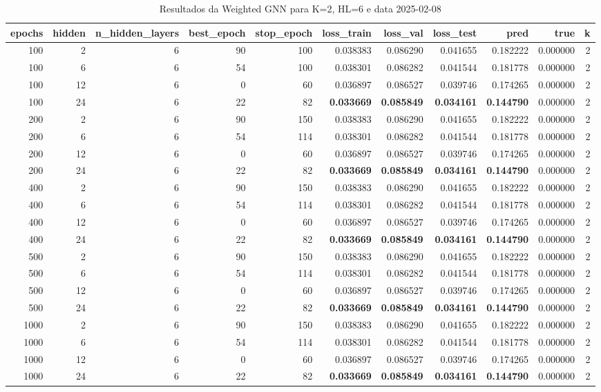 \begin{table}
\caption{Resultados da Weighted GNN para K=2, HL=6 e data 2025-02-08}
\label{tab:weighted_gnn_results_k2_hl6_d20250208}
\begin{tabular}{rrrrrrrrrrr}
\toprule
epochs & hidden & n\_hidden\_layers & best\_epoch & stop\_epoch & loss\_train & loss\_val & loss\_test & pred & true & k \\
\midrule
100 & 2 & 6 & 90 & 100 & 0.038383 & 0.086290 & 0.041655 & 0.182222 & 0.000000 & 2 \\
100 & 6 & 6 & 54 & 100 & 0.038301 & 0.086282 & 0.041544 & 0.181778 & 0.000000 & 2 \\
100 & 12 & 6 & 0 & 60 & 0.036897 & 0.086527 & 0.039746 & 0.174265 & 0.000000 & 2 \\
100 & 24 & 6 & 22 & 82 & \textbf{0.033669} & \textbf{0.085849} & \textbf{0.034161} & \textbf{0.144790} & 0.000000 & 2 \\
200 & 2 & 6 & 90 & 150 & 0.038383 & 0.086290 & 0.041655 & 0.182222 & 0.000000 & 2 \\
200 & 6 & 6 & 54 & 114 & 0.038301 & 0.086282 & 0.041544 & 0.181778 & 0.000000 & 2 \\
200 & 12 & 6 & 0 & 60 & 0.036897 & 0.086527 & 0.039746 & 0.174265 & 0.000000 & 2 \\
200 & 24 & 6 & 22 & 82 & \textbf{0.033669} & \textbf{0.085849} & \textbf{0.034161} & \textbf{0.144790} & 0.000000 & 2 \\
400 & 2 & 6 & 90 & 150 & 0.038383 & 0.086290 & 0.041655 & 0.182222 & 0.000000 & 2 \\
400 & 6 & 6 & 54 & 114 & 0.038301 & 0.086282 & 0.041544 & 0.181778 & 0.000000 & 2 \\
400 & 12 & 6 & 0 & 60 & 0.036897 & 0.086527 & 0.039746 & 0.174265 & 0.000000 & 2 \\
400 & 24 & 6 & 22 & 82 & \textbf{0.033669} & \textbf{0.085849} & \textbf{0.034161} & \textbf{0.144790} & 0.000000 & 2 \\
500 & 2 & 6 & 90 & 150 & 0.038383 & 0.086290 & 0.041655 & 0.182222 & 0.000000 & 2 \\
500 & 6 & 6 & 54 & 114 & 0.038301 & 0.086282 & 0.041544 & 0.181778 & 0.000000 & 2 \\
500 & 12 & 6 & 0 & 60 & 0.036897 & 0.086527 & 0.039746 & 0.174265 & 0.000000 & 2 \\
500 & 24 & 6 & 22 & 82 & \textbf{0.033669} & \textbf{0.085849} & \textbf{0.034161} & \textbf{0.144790} & 0.000000 & 2 \\
1000 & 2 & 6 & 90 & 150 & 0.038383 & 0.086290 & 0.041655 & 0.182222 & 0.000000 & 2 \\
1000 & 6 & 6 & 54 & 114 & 0.038301 & 0.086282 & 0.041544 & 0.181778 & 0.000000 & 2 \\
1000 & 12 & 6 & 0 & 60 & 0.036897 & 0.086527 & 0.039746 & 0.174265 & 0.000000 & 2 \\
1000 & 24 & 6 & 22 & 82 & \textbf{0.033669} & \textbf{0.085849} & \textbf{0.034161} & \textbf{0.144790} & 0.000000 & 2 \\
\bottomrule
\end{tabular}
\end{table}

